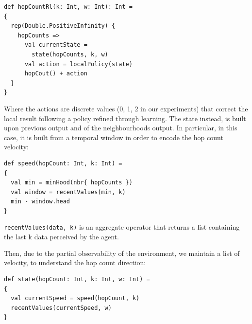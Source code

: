 \documentclass[conference]{IEEEtran}
\begin{document}
 \begin{verbatim}
def hopCountRl(k: Int, w: Int): Int = 
{
  rep(Double.PositiveInfinity) { 
    hopCounts => 
      val currentState = 
        state(hopCounts, k, w)
      val action = localPolicy(state)
      hopCout() + action
  }
}
\end{verbatim}

Where the actions are discrete values (0, 1, 2 in our experiments) that correct the local result following a policy refined through learning.
%
The state instead, is built upon previous output and of the neighbourhoods output.
 In particular, in this case, it is built from a temporal window in order to encode the hop count velocity:
\begin{verbatim}
def speed(hopCount: Int, k: Int) =
{
  val min = minHood(nbr{ hopCounts })
  val window = recentValues(min, k)
  min - window.head 
}
\end{verbatim}
\texttt{recentValues(data, k)} is an aggregate operator that returns a list containing the last k data perceived by the agent.

Then, due to the partial observability of the environment, we maintain a 
 list of velocity, to understand the hop count direction:

 \begin{verbatim}
def state(hopCount: Int, k: Int, w: Int) =
{
  val currentSpeed = speed(hopCount, k)
  recentValues(currentSpeed, w)
}
\end{verbatim}
\end{document}
